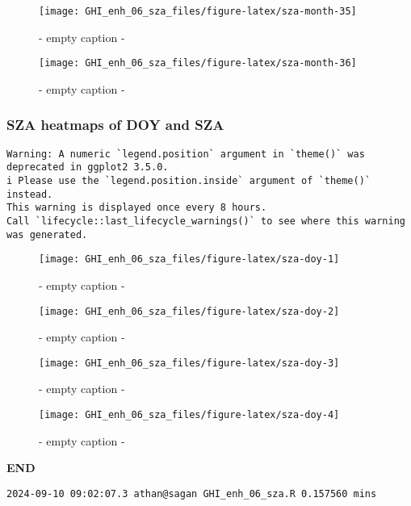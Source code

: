 \documentclass[
  10pt,
  a4paper,oneside]{article}
\begin{document}
\begin{figure}[H]

{\centering \texttt{[image: GHI\_enh\_06\_sza\_files/figure-latex/sza-month-35]} 

}

\caption{ - empty caption - }\label{fig:sza-month-35}
\end{figure}
\begin{figure}[H]

{\centering \texttt{[image: GHI\_enh\_06\_sza\_files/figure-latex/sza-month-36]} 

}

\caption{ - empty caption - }\label{fig:sza-month-36}
\end{figure}

\newpage
\FloatBarrier

\hypertarget{sza-heatmaps-of-doy-and-sza}{%
\subsubsection{SZA heatmaps of DOY and SZA}\label{sza-heatmaps-of-doy-and-sza}}

\begin{verbatim}
Warning: A numeric `legend.position` argument in `theme()` was deprecated in ggplot2 3.5.0.
i Please use the `legend.position.inside` argument of `theme()` instead.
This warning is displayed once every 8 hours.
Call `lifecycle::last_lifecycle_warnings()` to see where this warning was generated.
\end{verbatim}

\begin{figure}[H]

{\centering \texttt{[image: GHI\_enh\_06\_sza\_files/figure-latex/sza-doy-1]} 

}

\caption{ - empty caption - }\label{fig:sza-doy-1}
\end{figure}
\begin{figure}[H]

{\centering \texttt{[image: GHI\_enh\_06\_sza\_files/figure-latex/sza-doy-2]} 

}

\caption{ - empty caption - }\label{fig:sza-doy-2}
\end{figure}
\begin{figure}[H]

{\centering \texttt{[image: GHI\_enh\_06\_sza\_files/figure-latex/sza-doy-3]} 

}

\caption{ - empty caption - }\label{fig:sza-doy-3}
\end{figure}
\begin{figure}[H]

{\centering \texttt{[image: GHI\_enh\_06\_sza\_files/figure-latex/sza-doy-4]} 

}

\caption{ - empty caption - }\label{fig:sza-doy-4}
\end{figure}

\textbf{END}

\begin{verbatim}
2024-09-10 09:02:07.3 athan@sagan GHI_enh_06_sza.R 0.157560 mins
\end{verbatim}
\end{document}
